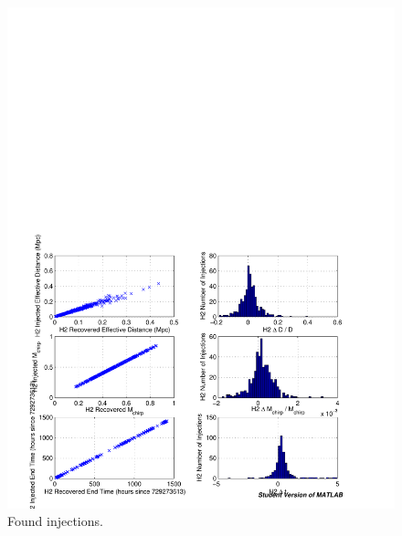 \begin{figure}[p]
\begin{center}
\includegraphics[width=\textwidth]{analysis/figures/h2_param_error}
\end{center}
\caption{\label{f:h2_param_error}%
Found injections.
}
\end{figure}

